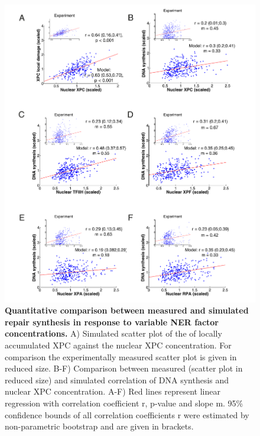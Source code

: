 \begin{figure}[htbp]
	\begin{center}
		\includegraphics[width=1\textwidth]{Abbildungen/figure3_6.pdf}
		\caption{\textbf{Quantitative comparison between measured and simulated repair synthesis in response to variable NER factor concentrations.} A) Simulated scatter plot of the of locally accumulated XPC against the nuclear XPC concentration. For comparison the experimentally measured scatter plot is given in reduced size.  B-F) Comparison between measured (scatter plot in reduced size) and simulated correlation of DNA synthesis and nuclear XPC concentration. A-F) Red lines represent linear regression with correlation coefficient r, p-value and slope m. 95\% confidence bounds of all correlation coefficients r were estimated by non-parametric bootstrap and are given in brackets.}
		\label{fig:Model_dataComp}
	\end{center}
\end{figure}

